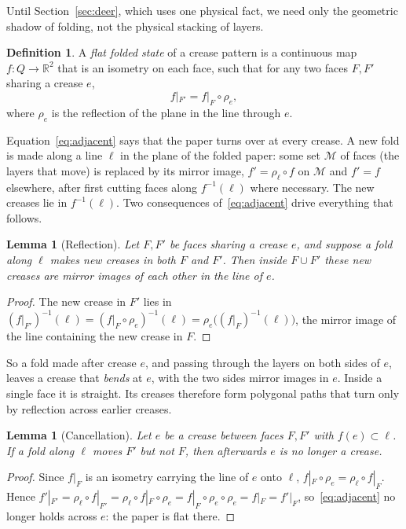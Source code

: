 \documentclass[11pt]{article}
\newtheorem{lemma}[theorem]{Lemma}
\theoremstyle{definition}
\newtheorem{definition}[theorem]{Definition}
\theoremstyle{remark}
\begin{document}
Until Section~\ref{sec:deer}, which uses one physical fact, we need only the geometric shadow of folding, not the physical stacking of layers.

\begin{definition}
A \emph{flat folded state} of a crease pattern is a continuous map $f\colon Q\to\mathbb{R}^2$ that is an isometry on each face, such that for any two faces $F,F'$ sharing a crease $e$,
\begin{equation}\label{eq:adjacent}
f|_{F'} = f|_F\circ\rho_e ,
\end{equation}
where $\rho_e$ is the reflection of the plane in the line through $e$.
\end{definition}

Equation~\eqref{eq:adjacent} says that the paper turns over at every crease. A new fold is made along a line $\ell$ in the plane of the folded paper: some set $\mathcal M$ of faces (the layers that move) is replaced by its mirror image, $f'=\rho_\ell\circ f$ on $\mathcal M$ and $f'=f$ elsewhere, after first cutting faces along $f^{-1}(\ell)$ where necessary. The new creases lie in $f^{-1}(\ell)$. Two consequences of~\eqref{eq:adjacent} drive everything that follows.

\begin{lemma}[Reflection]\label{lem:reflection}
Let $F,F'$ be faces sharing a crease $e$, and suppose a fold along $\ell$ makes new creases in both $F$ and $F'$. Then inside $F\cup F'$ these new creases are mirror images of each other in the line of $e$.
\end{lemma}
\begin{proof}
The new crease in $F'$ lies in $(f|_{F'})^{-1}(\ell)=(f|_F\circ\rho_e)^{-1}(\ell)=\rho_e\bigl((f|_F)^{-1}(\ell)\bigr)$, the mirror image of the line containing the new crease in $F$.
\end{proof}

So a fold made after crease $e$, and passing through the layers on both sides of $e$, leaves a crease that \emph{bends} at $e$, with the two sides mirror images in $e$. Inside a single face it is straight. Its creases therefore form polygonal paths that turn only by reflection across earlier creases.

\begin{lemma}[Cancellation]\label{lem:cancel}
Let $e$ be a crease between faces $F,F'$ with $f(e)\subset\ell$. If a fold along $\ell$ moves $F'$ but not $F$, then afterwards $e$ is no longer a crease.
\end{lemma}
\begin{proof}
Since $f|_F$ is an isometry carrying the line of $e$ onto $\ell$, $f|_F\circ\rho_e=\rho_\ell\circ f|_F$. Hence $f'|_{F'}=\rho_\ell\circ f|_{F'}=\rho_\ell\circ f|_F\circ\rho_e=f|_F\circ\rho_e\circ\rho_e=f|_F=f'|_F$, so~\eqref{eq:adjacent} no longer holds across $e$: the paper is flat there.
\end{proof}
\end{document}
